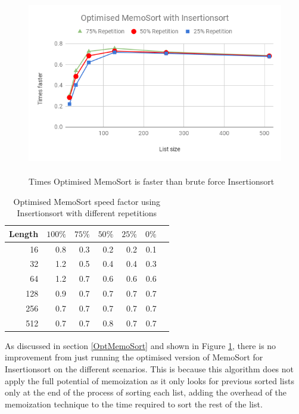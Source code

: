 \documentclass[a4paper,12pt]{article}
\begin{document}
\begin{figure}[H]
    \centering
    \includegraphics[height=8cm,keepaspectratio]{./images/OptMemoSortIns.png}
    \caption{Times Optimised MemoSort is faster than brute force Insertionsort}
    \label{fig:OptMemoSortInsGraph}
\end{figure}

\begin{table}[H]
\centering
\begin{tabular}{|r|r|r|r|r|r|r|}   \hline
	{Length} & {$100\%$} & {$75\%$} & {$50\%$} & {$25\%$} & {$0\%$} \\  \hline
	16 &0.8&0.3 & 0.2 & 0.2 & 0.1\\ 
	32 &1.2&0.5& 0.4& 0.4& 0.3\\ 
	64 &1.2 &0.7&0.6&0.6& 0.6\\ 
	128 &0.9&0.7&0.7&0.7&0.7\\ 
	256 &0.7&0.7&0.7&0.7&0.7\\ 
	512 & 0.7&0.7&0.8&0.7&0.7\\  \hline
\end{tabular}
\caption{Optimised MemoSort  speed factor using Insertionsort with different repetitions}
\label{fig:OptMemoSortInsTable}
\end{table}


As discussed in section \ref{OptMemoSort} and shown in Figure \ref{fig:OptMemoSortInsGraph}, there is no improvement from just running the optimised version of MemoSort for Insertionsort on the different scenarios. This is because this algorithm does not apply the full potential of memoization as it only looks for previous sorted lists only at the end of the process of sorting each list, adding the overhead of the memoization technique to the time required to sort the rest of the list.\\
\end{document}
